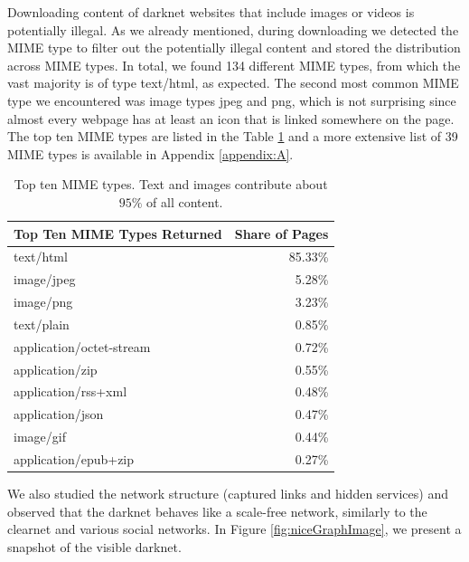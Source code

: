 Downloading content of darknet websites that include images or videos is potentially illegal. As we already mentioned, during downloading we detected the MIME type to filter out the potentially illegal content and stored the distribution across MIME types. In total, we found 134 different MIME types, from which the vast majority is of type text/html, as expected. The second most common MIME type we encountered was image types jpeg and png, which is not surprising since almost every webpage has at least an icon that is linked somewhere on the page. The top ten MIME types are listed in the Table \ref{table:mime_types} and a more extensive list of 39 MIME types is available in Appendix \ref{appendix:A}.
\ifdgruyter
  \begin{table}
    \centering
    \caption{Top ten MIME types. Text and images contribute about $95\%$ of all content.}
    \label{table:mime_types}
    \begin{tabular}{l|r}
         \textbf{Top Ten MIME Types Returned} & \textbf{Share of Pages} \\
         \hline
         \hline
    	text/html			&	85.33\% \\
    	\hline
    	image/jpeg			&	5.28\% \\
    	\hline
    	image/png			&	3.23\% \\
    	\hline
    	text/plain			&	0.85\% \\
    	\hline
    	application/octet-stream		&	0.72\% \\
    	\hline
    	application/zip		&	0.55\% \\
    	\hline
    	application/rss+xml	&	0.48\% \\
    	\hline
    	application/json	&	0.47\% \\
    	\hline
    	image/gif			&	0.44\% \\
    	\hline
    	application/epub+zip			&	0.27\% \\
    \end{tabular}
  \end{table}
\fi

%
%
\label{sh:networkStructure}
We also studied the network structure (captured links and hidden services) and observed that the darknet behaves like a scale-free network, similarly to the clearnet and various social networks.
In Figure \ref{fig:niceGraphImage}, we present a snapshot of the visible darknet.

